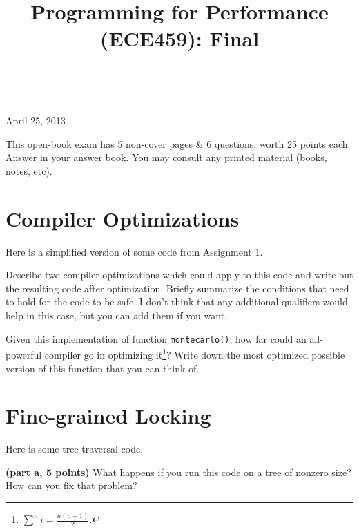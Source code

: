 \documentclass[12pt]{article}
\begin{document}
\title{Programming for Performance (ECE459): Final}
\author{}
\renewcommand{\today}{}
\maketitle

 ~\\[-8em]

\begin{center}
{\Large April 25, 2013}
\end{center}

\noindent
This open-book exam has 5 non-cover pages \& 6 questions, worth 25 points
each. Answer in your answer book. You may consult any
printed material (books, notes, etc).


\section{Compiler Optimizations}
Here is a simplified version of some code from Assignment 1.


\vspace*{1em}
Describe two compiler optimizations which could apply to this code
and write out the resulting code after optimization.
Briefly summarize the conditions that need to hold for the code
to be safe. I don't think that any additional qualifiers would
help in this case, but you can add them if you want.

\vspace*{1em}
Given this implementation of function {\tt montecarlo()}, 
how far could an all-powerful compiler go in optimizing it\footnote{$\sum^n i = \frac{n(n+1)}{2}$.}?
Write down the most optimized possible version of this
function that you can think of.

\section{Fine-grained Locking}

Here is some tree traversal code.


\vspace*{1em} \noindent
{\bf (part a, 5 points)} What happens if you run this code on a tree of
nonzero size? How can you fix that problem?

\end{document}
